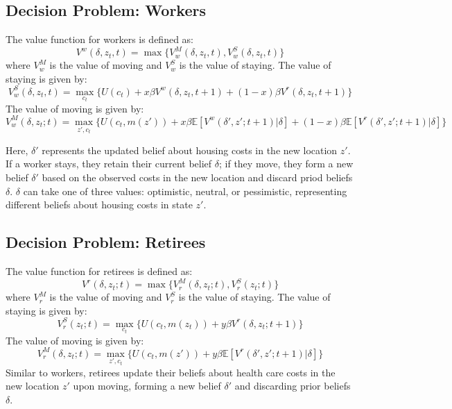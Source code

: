 \documentclass[11pt,a4paper]{article}
\begin{document}
\subsection{Decision Problem: Workers}
\label{subsec:worker_decision}
The value function for workers is defined as:
\begin{equation}
  V^w(\delta, z_t, t) = \max\{V_w^M(\delta, z_t, t), V_w^S(\delta, z_t, t)\}
\end{equation}
where $V_w^M$ is the value of moving and $V_w^S$ is the value of staying. The value of staying is given by:
\begin{equation}
  V^S_w(\delta, z_t, t) = \max_{c_t} \{U(c_t) + x\beta V^w(\delta, z_t, t+1) + (1-x)\beta V^r(\delta,z_t, t+1)\}
\end{equation}
The value of moving is given by:
\begin{equation}
  V^M_w(\delta, z_t; t) = \max_{z', c_t} \{U(c_t, m(z')) + x\beta \mathbb{E}[V^w(\delta', z'; t+1)|\delta] + (1-x)\beta\mathbb{E}[V^r(\delta', z'; t+1)|\delta]\}
\end{equation}

Here, $\delta'$ represents the updated belief about housing costs in the new location $z'$. If a worker stays, they retain their current belief $\delta$; if they move, they form a new belief $\delta'$ based on the observed costs in the new location and discard priod beliefs $\delta$. $\delta$ can take one of three values: optimistic, neutral, or pessimistic, representing different beliefs about housing costs in state $z'$. 

\subsection{Decision Problem: Retirees}
\label{subsec:retiree_decision}
The value function for retirees is defined as:
\begin{equation}
  V^r(\delta, z_t; t) = \max\{V_r^M(\delta, z_t; t), V_r^S(z_t; t)\}
\end{equation}
where $V_r^M$ is the value of moving and $V_r^S$ is the value of staying. The value of staying is given by:
\begin{equation}
  V^S_r(z_t; t) = \max_{c_t} \{U(c_t, m(z_t)) + y\beta V^r(\delta, z_t; t+1)\}
\end{equation}
The value of moving is given by:
\begin{equation}
  V^M_r(\delta, z_t; t) = \max_{z', c_t} \{U(c_t, m(z')) + y\beta \mathbb{E}[V^r(\delta', z'; t+1)|\delta]\}
\end{equation}
Similar to workers, retirees update their beliefs about health care costs in the new location $z'$ upon moving, forming a new belief $\delta'$ and discarding prior beliefs $\delta$.
\end{document}
